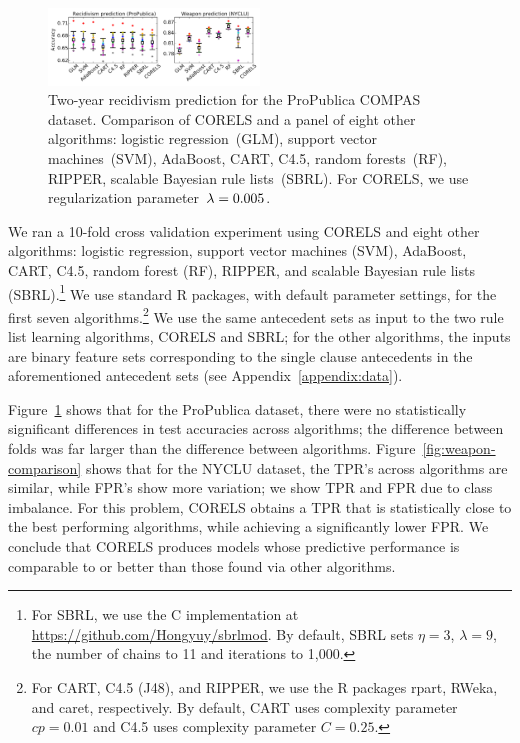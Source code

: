\begin{figure}[t!]
\begin{center}
\includegraphics[trim={2mm, 5mm, 102mm, 0mm}, clip,
width=0.5\textwidth]{figs/compare-compas-weapon.pdf}
\end{center}
\caption{Two-year recidivism prediction for the ProPublica COMPAS dataset.
%
Comparison of CORELS and a panel of eight other algorithms:
logistic regression~(GLM), support vector machines~(SVM),
AdaBoost, CART, C4.5, random forests~(RF), RIPPER,
scalable Bayesian rule lists~(SBRL).
%
For CORELS, we use regularization parameter~${{\lambda}=0.005}$.
}
\label{fig:compas-comparison}
\end{figure}

We ran a 10-fold cross validation experiment using CORELS
and eight other algorithms:
logistic regression, support vector machines (SVM), AdaBoost, CART, C4.5,
random forest (RF), RIPPER, and scalable Bayesian rule lists (SBRL).\footnote{For
SBRL, we use the C implementation at \url{https://github.com/Hongyuy/sbrlmod}.
By default, SBRL sets ${\eta = 3}$, ${\lambda = 9}$,
the number of chains to 11 and iterations to 1,000.}
%
We use standard R packages, with default parameter settings,
for the first seven algorithms.\footnote{For CART, C4.5 (J48), and RIPPER,
we use the R packages rpart, RWeka, and caret, respectively.
%
By default, CART uses complexity parameter ${cp = 0.01}$ and C4.5 uses complexity parameter ${C = 0.25}$.
}
%
We use the same antecedent sets as input to the two rule list learning algorithms, CORELS and SBRL;
for the other algorithms, the inputs are binary feature sets corresponding to the
single clause antecedents in the aforementioned antecedent sets (see Appendix~\ref{appendix:data}).

Figure~\ref{fig:compas-comparison} shows that for the ProPublica dataset,
there were no statistically significant differences in test accuracies across algorithms;
the difference between folds was far larger than the difference between algorithms.
%
Figure~\ref{fig:weapon-comparison} shows that for the NYCLU dataset,
the TPR's across algorithms are similar, while FPR's show more variation;
we show TPR and FPR due to class imbalance.
%
For this problem, CORELS obtains a TPR that is statistically close to the best performing algorithms,
while achieving a significantly lower FPR.
%
We conclude that CORELS produces models whose predictive performance is comparable to or better than
those found via other algorithms.

